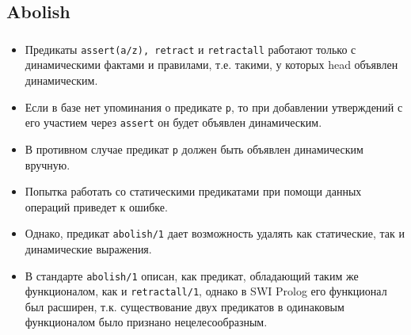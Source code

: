 

\subsection{Abolish}

\begin{frame}

	\frametitle{\insertsection}
	\framesubtitle{\insertsubsection}
	
	\begin{itemize}
		\item Предикаты \texttt{assert(a/z), retract} и \texttt{retractall} работают только с \alert{динамическими фактами и правилами}, т.е. такими, у которых head объявлен динамическим.
		\item Если в базе нет упоминания о предикате \texttt{p}, то при добавлении утверждений с его участием через \texttt{assert} он будет объявлен динамическим.
		\item В противном случае предикат \texttt{p} должен быть объявлен динамическим вручную.
		\item Попытка работать со статическими предикатами при помощи данных операций приведет к ошибке.
		\item Однако, предикат \texttt{abolish/1} дает возможность удалять как статические, так и динамические выражения.
		\item В стандарте \texttt{abolish/1} описан, как предикат, обладающий таким же функционалом, как и \texttt{retractall/1}, однако в SWI Prolog его функционал был расширен, т.к. существование двух предикатов в одинаковым функционалом было признано нецелесообразным.
	\end{itemize}

\end{frame}


